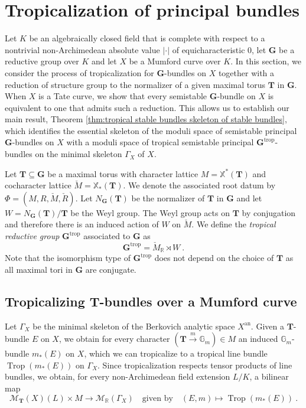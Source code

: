 \documentclass[10pt, a4paper]{amsart}
\theoremstyle{definition}
\theoremstyle{myitemstyle}
\newcommand{\R}{\mathbb{R}}
\newcommand{\G}{\mathbb{G}}
\newcommand{\Mcheck}{{\check{M}}}
\newcommand{\Rcheck}{\check{R}}
\newcommand{\bfG}{\mathbf{G}}
\newcommand{\bfT}{\mathbf{T}}
\newcommand{\mc}[1]{{\mathcal{#1}}}
\DeclareMathOperator{\Trop}{Trop}
\newcommand{\an}{\mathrm{an}}
\newcommand{\trop}{{\mathrm{trop}}}
\newcommand{\Ga}{\Gamma}
\begin{document}
\section{Tropicalization of principal bundles}\label{sec_tropicalization}



Let $K$ be an algebraically closed field that is complete with respect to a nontrivial non-Archimedean absolute value $|\cdot|$ of equicharacteristic $0$, let $\mathbf{G}$ be a reductive group over $K$ and let $X$ be a Mumford curve over $K$. In this section, we consider the process of tropicalization for $\mathbf{G}$-bundles on $X$ together with a reduction of structure group to the normalizer of a given maximal torus $\mathbf{T}$ in $\mathbf{G}$. When $X$ is a Tate curve, we show that every semistable $\mathbf{G}$-bundle on $X$ is equivalent to one that admits such a reduction. This allows us to establish our main result, Theorem \ref{thm:tropical stable bundles skeleton of stable bundles}, which identifies the essential skeleton of the moduli space of semistable principal $\mathbf{G}$-bundles on $X$ with a moduli space of tropical semistable principal $\mathbf{G}^{\trop}$-bundles on the minimal skeleton $\Gamma_X$ of $X$. 


Let $\mathbf{T} \subseteq \mathbf{G}$ be a maximal torus with character lattice $M = \mathbb{X}^*(\mathbf{T})$ and cocharacter lattice $\Mcheck = \mathbb{X}_*(\mathbf{T})$. We denote the associated root datum by $\Phi = (M,R,\Mcheck,\Rcheck)$. Let $N_\mathbf{G}(\mathbf{T})$ be the normalizer of $\bfT$ in $\bfG$ and let $W=N_\bfG(\bfT)/\bfT$ be the Weyl group. The Weyl group acts on $\bfT$ by conjugation and therefore there is an induced action of $W$ on $\Mcheck$. We define the \emph{tropical reductive group} $\bfG^\trop$ associated to $\bfG$ as 
\[
\bfG^\trop= \Mcheck_\R \rtimes W \ .
\]
Note that the isomorphism type of $\bfG^\trop$ does not depend on the choice of $\bfT$ as all maximal tori in $\bfG$ are conjugate. 

\subsection{Tropicalizing $\bfT$-bundles over a Mumford curve}

Let $\Gamma_X$ be the minimal skeleton of the Berkovich analytic space $X^{\an}$. Given a $\bfT$-bundle $E$ on $X$, we obtain for every character $(\bfT\xrightarrow{m}\G_m)\in M$ an induced $\G_m$-bundle $m_*(E)$ on $X$, which we can tropicalize to a tropical line bundle $\Trop(m_*(E))$ on $\Gamma_X$. Since tropicalization respects tensor products of line bundles, we obtain, for every non-Archimedean field extension $L/K$, a bilinear map
\[
\mc M_\bfT(X)(L)\times M\longrightarrow \mc M_{\R}(\Ga_X)  \quad\text{given by}\quad (E,m) \longmapsto \Trop(m_*(E)) \ .
\]
\end{document}
